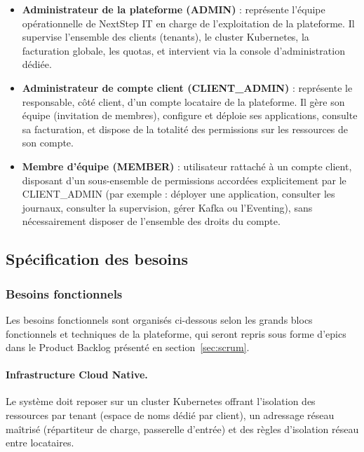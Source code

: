     \begin{itemize}
        \item \textbf{Administrateur de la plateforme (ADMIN)} : représente l'équipe opérationnelle de NextStep IT en charge de l'exploitation de la plateforme. Il supervise l'ensemble des clients (tenants), le cluster Kubernetes, la facturation globale, les quotas, et intervient via la console d'administration dédiée.
    
        \item \textbf{Administrateur de compte client (CLIENT\_ADMIN)} : représente le responsable, côté client, d'un compte locataire de la plateforme. Il gère son équipe (invitation de membres), configure et déploie ses applications, consulte sa facturation, et dispose de la totalité des permissions sur les ressources de son compte.
    
        \item \textbf{Membre d'équipe (MEMBER)} : utilisateur rattaché à un compte client, disposant d'un sous-ensemble de permissions accordées explicitement par le CLIENT\_ADMIN (par exemple : déployer une application, consulter les journaux, consulter la supervision, gérer Kafka ou l'Eventing), sans nécessairement disposer de l'ensemble des droits du compte.
    \end{itemize}
    
    
    
    \subsection{Spécification des besoins}
    
    \subsubsection{Besoins fonctionnels}
    \label{sec:besoins-fonctionnels}
    
    Les besoins fonctionnels sont organisés ci-dessous selon les grands blocs fonctionnels et techniques de la plateforme, qui seront repris sous forme d'epics dans le Product Backlog présenté en section~\ref{sec:scrum}.
    
    \paragraph{Infrastructure Cloud Native.} Le système doit reposer sur un cluster Kubernetes offrant l'isolation des ressources par tenant (espace de noms dédié par client), un adressage réseau maîtrisé (répartiteur de charge, passerelle d'entrée) et des règles d'isolation réseau entre locataires.
    
